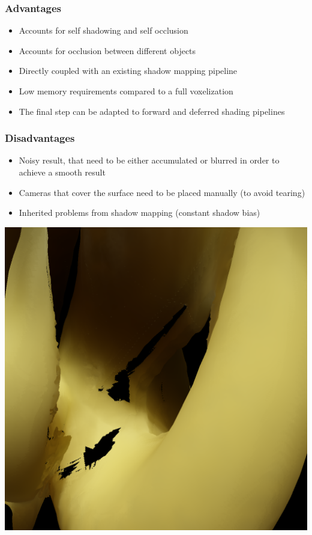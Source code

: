 \documentclass{beamer}
\begin{document}
\begin{frame}
    \frametitle{Advantages}
\begin{itemize}
	\item Accounts for self shadowing and self occlusion
	\item Accounts for occlusion between different objects
	\item Directly coupled with an existing shadow mapping pipeline
	\item Low memory requirements compared to a full voxelization
	\item The final step can be adapted to forward and deferred shading pipelines
\end{itemize}
\end{frame}


\begin{frame}
    \frametitle{Disadvantages}
\begin{itemize}
	\item Noisy result, that need to be either accumulated or blurred in order to achieve a smooth result
	\item Cameras that cover the surface need to be placed manually (to avoid tearing)
	\item Inherited problems from shadow mapping (constant shadow bias)
\end{itemize}
	\centering
	\includegraphics[width=0.3 \textwidth]{tearing}
\end{frame}
\end{document}
